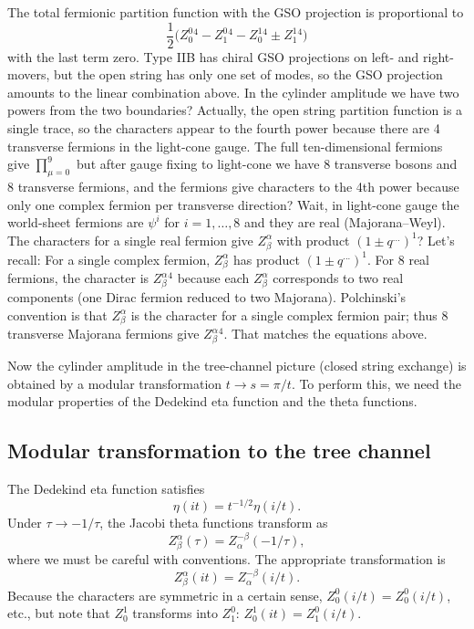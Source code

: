 \documentclass[11pt,a4paper]{article}
\begin{document}
The total fermionic partition function with the GSO projection is proportional to
\begin{equation}
\frac12\big( Z^0_0{}^{4} - Z^0_1{}^{4} - Z^1_0{}^{4} \pm Z^1_1{}^{4} \big)
\end{equation}
with the last term zero. Type IIB has chiral GSO projections on left- and right-movers, but the open string has only one set of modes, so the GSO projection amounts to the linear combination above. In the cylinder amplitude we have two powers from the two boundaries? Actually, the open string partition function is a single trace, so the characters appear to the fourth power because there are 4 transverse fermions in the light-cone gauge. The full ten-dimensional fermions give $\prod_{\mu=0}^9$ but after gauge fixing to light-cone we have 8 transverse bosons and 8 transverse fermions, and the fermions give characters to the 4th power because only one complex fermion per transverse direction? Wait, in light-cone gauge the world-sheet fermions are $\psi^i$ for $i=1,\dots,8$ and they are real (Majorana–Weyl). The characters for a single real fermion give $Z^\alpha_\beta$ with product $(1\pm q^{...})^{1}$? Let's recall: For a single complex fermion, $Z^\alpha_\beta$ has product $(1\pm q^{...})^{1}$. For 8 real fermions, the character is $Z^\alpha_\beta{}^{4}$ because each $Z^\alpha_\beta$ corresponds to two real components (one Dirac fermion reduced to two Majorana). Polchinski's convention is that $Z^\alpha_\beta$ is the character for a single complex fermion pair; thus 8 transverse Majorana fermions give $Z^\alpha_\beta{}^4$. That matches the equations above.

Now the cylinder amplitude in the tree-channel picture (closed string exchange) is obtained by a modular transformation $t \to s = \pi/t$. To perform this, we need the modular properties of the Dedekind eta function and the theta functions.

\subsection{Modular transformation to the tree channel}
The Dedekind eta function satisfies
\begin{equation}
\eta(it) = t^{-1/2} \eta(i/t).
\end{equation}
Under $\tau \to -1/\tau$, the Jacobi theta functions transform as
\begin{equation}
Z^\alpha_\beta(\tau) = Z^{-\beta}_{\alpha}(-1/\tau),
\end{equation}
where we must be careful with conventions. The appropriate transformation is
\begin{equation}
Z^\alpha_\beta(it) = Z^{-\beta}_{\alpha}(i/t).
\end{equation}
Because the characters are symmetric in a certain sense, $Z^0_0(i/t) = Z^0_0(i/t)$, etc., but note that $Z^1_0$ transforms into $Z^0_1$: $Z^1_0(it) = Z^0_1(i/t)$.
\end{document}
